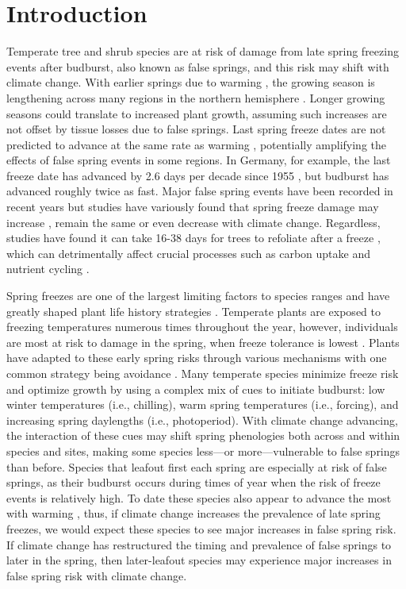 \documentclass{article}\usepackage[]{graphicx}\usepackage[]{color}
\begin{document}
\section*{Introduction}
Temperate tree and shrub species are at risk of damage from late spring freezing events after budburst, also known as false springs, and this risk may shift with climate change. With earlier springs due to warming \citep{IPCC2014, Wolkovich2012}, the growing season is lengthening across many regions in the northern hemisphere \citep{Chen2005, Kukal2018, Liu2006}. Longer growing seasons could translate to increased plant growth, assuming such increases are not offset by tissue losses due to false springs. Last spring freeze dates are not predicted to advance at the same rate as warming \citep{Inouye2008, Labe2016, Martin2010,Wypych2016a,Sgubin2018}, potentially amplifying the effects of false spring events in some regions. In Germany, for example, the last freeze date has advanced by 2.6 days per decade since 1955 \citep{Zohner2016}, but budburst has advanced roughly twice as fast. Major false spring events have been recorded in recent years but studies have variously found that spring freeze damage may increase \citep{Augspurger2013, Hannenin1991, Labe2016}, remain the same \citep{Scheifinger2003} or even decrease \citep{Kramer1994, Vitra2017} with climate change. Regardless, studies have found it can take 16-38 days for trees to refoliate after a freeze \citep{Augspurger2009, Augspurger2013, Gu2008, Menzel2015}, which can detrimentally affect crucial processes such as carbon uptake and nutrient cycling \citep{Hufkens2012, Klosterman2018, Richardson2013}.  

Spring freezes are one of the largest limiting factors to species ranges and have greatly shaped plant life history strategies \citep{Kollas2014}. Temperate plants are exposed to freezing temperatures numerous times throughout the year, however, individuals are most at risk to damage in the spring, when freeze tolerance is lowest \citep{Sakai1987}. Plants have adapted to these early spring risks through various mechanisms with one common strategy being avoidance \citep{Vitasse2014}. Many temperate species minimize freeze risk and optimize growth by using a complex mix of cues to initiate budburst: low winter temperatures (i.e., chilling), warm spring temperatures (i.e., forcing), and increasing spring daylengths (i.e., photoperiod). With climate change advancing, the interaction of these cues may shift spring phenologies both across and within species and sites, making some species less---or more---vulnerable to false springs than before. Species that leafout first each spring are especially at risk of false springs, as their budburst occurs during times of year when the risk of freeze events is relatively high. To date these species also appear to advance the most with warming  \citep{Wolkovich2012}, thus, if climate change increases the prevalence of late spring freezes, we would expect these species to see major increases in false spring risk. If climate change has restructured the timing and prevalence of false springs to later in the spring, then later-leafout species may experience major increases in false spring risk with climate change. 
\end{document}
